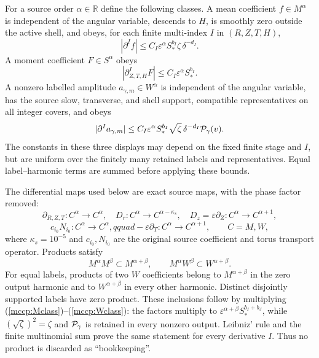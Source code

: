 \documentclass[11pt]{article}
\begin{document}
For a source order $\alpha\in\mathbb R$ define the following classes.
A mean coefficient $f\in M^\alpha$ is independent of the angular
variable, descends to $H$, is smoothly zero outside the active shell,
and obeys, for each finite multi-index $I$ in $(R,Z,T,H)$,
\begin{equation}\label{mccp:Mclass}
 |\partial^I f|\le C_I\varepsilon^\alpha S_*^{b_I}
                  \zeta\,\delta^{-d_I}.
\end{equation}
A moment coefficient $F\in S^\alpha$ obeys
\begin{equation}\label{mccp:Sclass}
 |\partial_{Z,T,H}^I F|\le C_I\varepsilon^\alpha S_*^{b_I}.
\end{equation}
A nonzero labelled amplitude $a_{\gamma,m}\in W^\alpha$ is independent
of the angular variable, has the source slow, transverse, and shell
support, compatible representatives on all integer covers, and obeys
\begin{equation}\label{mccp:Wclass}
 |\partial^I a_{\gamma,m}|
 \le C_I\varepsilon^\alpha S_*^{b_I}
       \sqrt\zeta\,\delta^{-d_I}{\cal P}_\gamma(v).
\end{equation}
The constants in these three displays may depend on the fixed finite
stage and $I$, but are uniform over the finitely many retained labels and
representatives. Equal label--harmonic terms are summed before applying
these bounds.

The differential maps used below are exact source maps, with the phase
factor removed:
\begin{equation}\label{mccp:derivative_maps}
 \partial_{R,Z,T}:C^\alpha\to C^\alpha,\quad
 D_r:C^\alpha\to C^{\alpha-\kappa_s},\quad
 D_z=\varepsilon\partial_Z:C^\alpha\to C^{\alpha+1},
\end{equation}
\[
 c_{i_0}N_{i_0}:C^\alpha\to C^\alpha,qquad
 -\varepsilon\partial_T:C^\alpha\to C^{\alpha+1},
 \qquad C=M,W,
\]
where $\kappa_s=10^{-5}$ and $c_{i_0},N_{i_0}$ are the original source
coefficient and torus transport operator. Products satisfy
\begin{equation}\label{mccp:product_closure}
 M^\alpha M^\beta\subset M^{\alpha+\beta},\qquad
 M^\alpha W^\beta\subset W^{\alpha+\beta}.
\end{equation}
For equal labels, products of two $W$ coefficients belong to
$M^{\alpha+\beta}$ in the zero output harmonic and to
$W^{\alpha+\beta}$ in every other harmonic. Distinct disjointly
supported labels have zero product. These inclusions follow by multiplying
(\ref{mccp:Mclass})--(\ref{mccp:Wclass}): the factors multiply to
$\varepsilon^{\alpha+\beta}S_*^{b_I+b_J}$, while
$(\sqrt\zeta)^2=\zeta$ and ${\cal P}_\gamma$ is retained in every
nonzero output. Leibniz' rule and the finite multinomial sum prove the
same statement for every derivative $I$. Thus no product is discarded as
``bookkeeping''.
\end{document}
